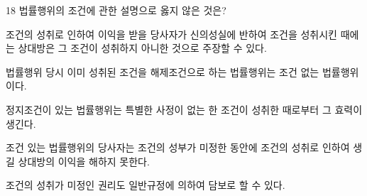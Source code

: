\begin{question}{18}
법률행위의 조건에 관한 설명으로 옳지 않은 것은?
\begin{choices}
  \item 조건의 성취로 인하여 이익을 받을 당사자가 신의성실에 반하여 조건을 성취시킨 때에는 상대방은 그 조건이 성취하지 아니한 것으로 주장할 수 있다.
  \item 법률행위 당시 이미 성취된 조건을 해제조건으로 하는 법률행위는 조건 없는 법률행위이다.
  \item 정지조건이 있는 법률행위는 특별한 사정이 없는 한 조건이 성취한 때로부터 그 효력이 생긴다.
  \item 조건 있는 법률행위의 당사자는 조건의 성부가 미정한 동안에 조건의 성취로 인하여 생길 상대방의 이익을 해하지 못한다.
  \item 조건의 성취가 미정인 권리도 일반규정에 의하여 담보로 할 수 있다.
\end{choices}
\end{question}
